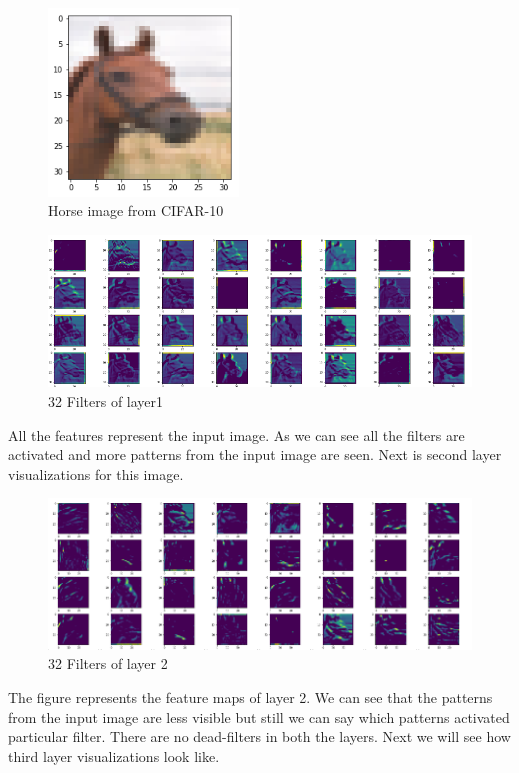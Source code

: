 \begin{figure}[h]
    \centering
    \includegraphics[width=0.45\textwidth]{thesis_template/images/horse.png}
    \caption{\small Horse image from CIFAR-10 }
    \label{}
    \end{figure}
    
\begin{figure}[h]
    \centering
    \includegraphics[width=1.0\textwidth]{thesis_template/images/horsefil1.png}
    \caption{\small 32 Filters of layer1}
    \label{}
    \end{figure}

\newpage \noindent All the features represent the input image. As we can see all the filters are activated and more patterns from the input image are seen. Next is second layer visualizations for this image.

\begin{figure}[h]
    \centering
    \includegraphics[width=1.1\textwidth]{thesis_template/images/horsefil2.png}
    \caption{\small 32 Filters of layer 2}
    \label{}
    \end{figure}
\newpage \noindent The figure represents the feature maps of layer 2. We can see that the patterns from the input image are less visible but still we can say which patterns activated particular filter. There are no dead-filters in both the layers. Next we will see how third layer visualizations look like.

